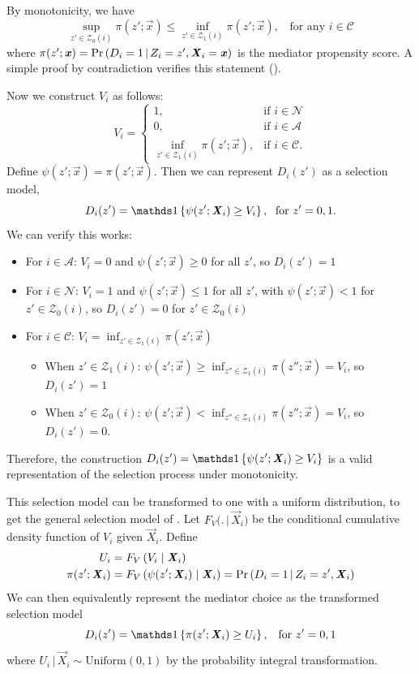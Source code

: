 By monotonicity, we have
\[ \sup_{z' \in \mathcal{Z}_0(i)} \pi(z';\vec{x})
    \leq \inf_{z' \in \mathcal{Z}_1(i)} \pi(z';\vec{x}), \;\;
    \text{ for any } i \in \mathcal{C} \]
where $\pi(z';\boldsymbol{\mathit{x}}) = \Pr\left( D_i = 1 \, \middle\vert \, Z_i = z', \boldsymbol{\mathit{X}}_i = \boldsymbol{\mathit{x}} \right)$ is the mediator propensity score.
A simple proof by contradiction verifies this statement (\citealt[Lemma 1]{vytlacil2002independence}).

Now we construct $V_i$ as follows:
\[ V_i = 
    \begin{cases}
        1, & \text{if } i \in \mathcal{N} \\
        0, & \text{if } i \in \mathcal{A} \\
        \inf_{z' \in \mathcal{Z}_1(i)} \pi(z';\vec{x}), & \text{if } i \in \mathcal{C}.
    \end{cases} \]
Define $\psi(z';\vec{x}) = \pi(z';\vec{x})$.
Then we can represent $D_i(z')$ as a selection model,
\[ D_i(z') = \indicator{\psi(z';\vec{X}_i) \geq V_i}, \;\text{ for } z'=0,1. \]
We can verify this works:
\begin{itemize}
    \item For $i \in \mathcal{A}$: $V_i = 0$ and $\psi(z';\vec{x}) \geq 0$ for all $z'$, so $D_i(z') = 1$
    
    \item For $i \in \mathcal{N}$: $V_i = 1$ and $\psi(z';\vec{x}) \leq 1$ for all $z'$, with $\psi(z';\vec{x}) < 1$ for $z' \in \mathcal{Z}_0(i)$, so $D_i(z') = 0$ for $z' \in \mathcal{Z}_0(i)$
    
    \item For $i \in \mathcal{C}$: $V_i = \inf_{z' \in \mathcal{Z}_1(i)} \pi(z';\vec{x})$
    \begin{itemize}
        \item When $z' \in \mathcal{Z}_1(i)$: $\psi(z';\vec{x}) \geq \inf_{z'' \in \mathcal{Z}_1(i)} \pi(z'';\vec{x}) = V_i$, so $D_i(z') = 1$
        \item When $z' \in \mathcal{Z}_0(i)$: $\psi(z';\vec{x}) < \inf_{z'' \in \mathcal{Z}_1(i)} \pi(z'';\vec{x}) = V_i$, so $D_i(z') = 0$.
    \end{itemize}
\end{itemize}
Therefore, the construction $D_i(z') = \indicator{\psi(z';\vec{X}_i) \geq V_i}$ is a valid representation of the selection process under monotonicity.

This selection model can be transformed to one with a uniform distribution, to get the general selection model of \cite{heckman2005structural}.
Let $F_V \big( .\, \big|\, \vec{X}_i \big)$ be the conditional cumulative density function of $V_i$ given $\vec{X}_i$.
Define
\begin{align*}
    U_i &= F_V \left( V_i \mid \boldsymbol{\mathit{X}}_i \right) \\
    \pi(z'; \boldsymbol{\mathit{X}}_i) 
        &= F_V\left( \psi(z'; \boldsymbol{\mathit{X}}_i) \mid \boldsymbol{\mathit{X}}_i \right)
        = \Pr\left( D_i = 1 \, \middle\vert \, Z_i = z', \boldsymbol{\mathit{X}}_i \right)
\end{align*}
We can then equivalently represent the mediator choice as the transformed selection model
\[ D_i(z') = \indicator{\pi(z'; \vec{X}_i) \geq U_i}, \;\;\; \text{for } z'=0,1 \]
where $U_i \,| \,\vec{X}_i \sim \text{Uniform}(0,1)$ by the probability integral transformation.

